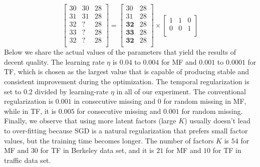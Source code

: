 \begin{equation}
\label{temporalSplit_matrix}
\begin{bmatrix}
30 & 30 & 28\\
31 & 31 & 28\\
32 &  ? & 28\\
33 &  ? & 28\\
32 &  ? & 28\\
\end{bmatrix} 
= 
\begin{bmatrix}
30 & 28\\
31 & 28\\
\mathbf{32} & 28\\
\mathbf{33} & 28\\
\mathbf{32} & 28\\
\end{bmatrix} 
\times
\begin{bmatrix}
1 & 1 & 0\\
0 & 0 & 1\\
\end{bmatrix} 
\end{equation}
Below we share the actual values of the parameters that yield the results of decent quality.
The learning rate $\eta$ is $0.04$ to $0.004$ for MF and $0.001$ to $0.0001$ for TF, which is chosen as the largest value that is capable of producing stable and consistent improvement during the optimization.
The temporal regularization is set to $0.2$ divided by learning-rate $\eta$ in all of our experiment.
The conventional regularization is $0.001$ in consecutive missing and $0$ for random missing in MF, while in TF, it is $0.005$ for consecutive missing and $0.001$ for random missing.
Finally, we observe that using more latent factors (large $K$) usually doesn't lead to over-fitting because SGD is a natural regularization that prefers small factor values, but the training time becomes longer.
The number of factors $K$ is $54$ for MF and $30$ for TF in Berkeley data set, and it is $21$ for MF and $10$ for TF in traffic data set. 

